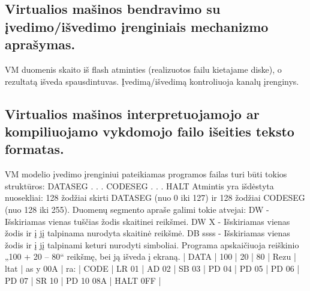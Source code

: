 \documentclass[oneside]{VUMIFPSkursinis}
\begin{document}
\subsection{Virtualios mašinos bendravimo su įvedimo/išvedimo įrenginiais mechanizmo aprašymas.}
VM duomenis skaito iš flash atminties (realizuotos failu kietajame diske), o rezultatą išveda spausdintuvas. Įvedimą/išvedimą kontroliuoja kanalų įrenginys.
\subsection{Virtualios mašinos interpretuojamojo ar kompiliuojamo vykdomojo failo išeities teksto formatas.}
VM modelio įvedimo įrenginiui pateikiamas programos failas turi būti tokios struktūros: \newline
DATASEG\newline
.\newline
.\newline
.\newline
CODESEG\newline
.\newline
.\newline
.\newline
HALT\newline
Atmintis yra išdėstyta nuosekliai: 128 žodžiai skirti DATASEG (nuo 0 iki 127) ir 128 žodžiai\newline
CODESEG (nuo 128 iki 255).\newline
Duomenų segmento apraše galimi tokie atvejai:\newline
DW - Išskiriamas vienas tuščias žodis skaitinei reikšmei.\newline
DW X - Išskiriamas vienas žodis ir į jį talpinama nurodyta skaitinė reikšmė.\newline
DB ssss - Išskiriamas vienas žodis ir į jį talpinami keturi nurodyti simboliai.\newline
Programa apskaičiuoja reiškinio „100 + 20 – 80“ reikšmę, bei ją išveda į ekraną. | DATA | 100 | 20 | 80 | Rezu | ltat | as y\newline
00A | ra: | CODE | LR 01 | AD 02 | SB 03 | PD 04 | PD 05 | PD 06 | PD 07 | SR 10 | PD 10\newline
08A | HALT\newline
0FF |\newline
\end{document}
